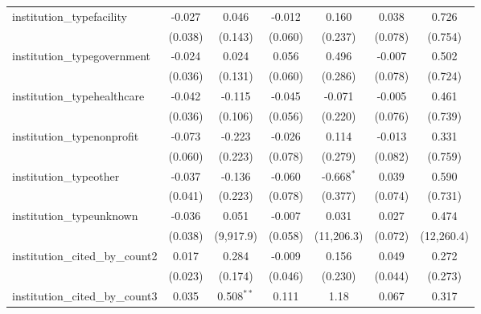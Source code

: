\begin{tabular}{lcccccc}
   institution\_typefacility             & -0.027         & 0.046         & -0.012        & 0.160        & 0.038        & 0.726\\   
                                         & (0.038)        & (0.143)       & (0.060)       & (0.237)      & (0.078)      & (0.754)\\   
   institution\_typegovernment           & -0.024         & 0.024         & 0.056         & 0.496        & -0.007       & 0.502\\   
                                         & (0.036)        & (0.131)       & (0.060)       & (0.286)      & (0.078)      & (0.724)\\   
   institution\_typehealthcare           & -0.042         & -0.115        & -0.045        & -0.071       & -0.005       & 0.461\\   
                                         & (0.036)        & (0.106)       & (0.056)       & (0.220)      & (0.076)      & (0.739)\\   
   institution\_typenonprofit            & -0.073         & -0.223        & -0.026        & 0.114        & -0.013       & 0.331\\   
                                         & (0.060)        & (0.223)       & (0.078)       & (0.279)      & (0.082)      & (0.759)\\   
   institution\_typeother                & -0.037         & -0.136        & -0.060        & -0.668$^{*}$ & 0.039        & 0.590\\   
                                         & (0.041)        & (0.223)       & (0.078)       & (0.377)      & (0.074)      & (0.731)\\   
   institution\_typeunknown              & -0.036         & 0.051         & -0.007        & 0.031        & 0.027        & 0.474\\   
                                         & (0.038)        & (9,917.9)     & (0.058)       & (11,206.3)   & (0.072)      & (12,260.4)\\   
   institution\_cited\_by\_count2        & 0.017          & 0.284         & -0.009        & 0.156        & 0.049        & 0.272\\   
                                         & (0.023)        & (0.174)       & (0.046)       & (0.230)      & (0.044)      & (0.273)\\   
   institution\_cited\_by\_count3        & 0.035          & 0.508$^{**}$  & 0.111         & 1.18         & 0.067        & 0.317\\   

\end{tabular}
